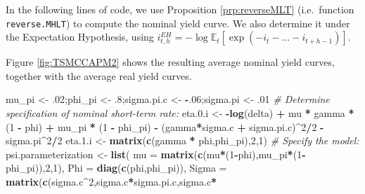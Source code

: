 \documentclass[
  12pt,
]{book}
\newenvironment{Shaded}{\begin{snugshade}}{\end{snugshade}}
\newcommand{\AttributeTok}[1]{\textcolor[rgb]{0.13,0.29,0.53}{#1}}
\newcommand{\CommentTok}[1]{\textcolor[rgb]{0.56,0.35,0.01}{\textit{#1}}}
\newcommand{\DecValTok}[1]{\textcolor[rgb]{0.00,0.00,0.81}{#1}}
\newcommand{\FloatTok}[1]{\textcolor[rgb]{0.00,0.00,0.81}{#1}}
\newcommand{\FunctionTok}[1]{\textcolor[rgb]{0.13,0.29,0.53}{\textbf{#1}}}
\newcommand{\NormalTok}[1]{#1}
\newcommand{\OtherTok}[1]{\textcolor[rgb]{0.56,0.35,0.01}{#1}}
\newcommand{\SpecialCharTok}[1]{\textcolor[rgb]{0.81,0.36,0.00}{\textbf{#1}}}
\theoremstyle{definition}
\theoremstyle{definition}
\theoremstyle{definition}
\theoremstyle{definition}
\theoremstyle{remark}
\begin{document}
In the following lines of code, we use Proposition \ref{prp:reverseMLT} (i.e.~function \texttt{reverse.MHLT}) to compute the nominal yield curve. We also determine it under the Expectation Hypothesis, using \(i^{EH}_{t,h} = - \log \mathbb{E}_t [\exp(-i_t - \dots - i_{t+h-1})]\).

Figure \ref{fig:TSMCCAPM2} shows the resulting average nominal yield curves, together with the average real yield curves.

\begin{Shaded}
\begin{Highlighting}[]
\NormalTok{mu\_pi }\OtherTok{\textless{}{-}}\NormalTok{ .}\DecValTok{02}\NormalTok{;phi\_pi }\OtherTok{\textless{}{-}}\NormalTok{ .}\DecValTok{8}\NormalTok{;sigma.pi.c }\OtherTok{\textless{}{-}} \SpecialCharTok{{-}}\NormalTok{.}\DecValTok{06}\NormalTok{;sigma.pi   }\OtherTok{\textless{}{-}}\NormalTok{ .}\DecValTok{01}
\CommentTok{\# Determine specification of nominal short{-}term rate:}
\NormalTok{eta.}\FloatTok{0.}\NormalTok{i }\OtherTok{\textless{}{-}} \SpecialCharTok{{-}}\FunctionTok{log}\NormalTok{(delta) }\SpecialCharTok{+}\NormalTok{ mu }\SpecialCharTok{*}\NormalTok{ gamma }\SpecialCharTok{*}\NormalTok{ (}\DecValTok{1} \SpecialCharTok{{-}}\NormalTok{ phi) }\SpecialCharTok{+}\NormalTok{ mu\_pi }\SpecialCharTok{*} 
\NormalTok{  (}\DecValTok{1} \SpecialCharTok{{-}}\NormalTok{ phi\_pi) }\SpecialCharTok{{-}}\NormalTok{ (gamma}\SpecialCharTok{*}\NormalTok{sigma.c }\SpecialCharTok{+}\NormalTok{ sigma.pi.c)}\SpecialCharTok{\^{}}\DecValTok{2}\SpecialCharTok{/}\DecValTok{2} \SpecialCharTok{{-}}\NormalTok{ sigma.pi}\SpecialCharTok{\^{}}\DecValTok{2}\SpecialCharTok{/}\DecValTok{2}
\NormalTok{eta.}\FloatTok{1.}\NormalTok{i }\OtherTok{\textless{}{-}} \FunctionTok{matrix}\NormalTok{(}\FunctionTok{c}\NormalTok{(gamma }\SpecialCharTok{*}\NormalTok{ phi,phi\_pi),}\DecValTok{2}\NormalTok{,}\DecValTok{1}\NormalTok{)}
\CommentTok{\# Specify the model:}
\NormalTok{psi.parameterization }\OtherTok{\textless{}{-}} \FunctionTok{list}\NormalTok{(}
  \AttributeTok{mu =} \FunctionTok{matrix}\NormalTok{(}\FunctionTok{c}\NormalTok{(mu}\SpecialCharTok{*}\NormalTok{(}\DecValTok{1}\SpecialCharTok{{-}}\NormalTok{phi),mu\_pi}\SpecialCharTok{*}\NormalTok{(}\DecValTok{1}\SpecialCharTok{{-}}\NormalTok{phi\_pi)),}\DecValTok{2}\NormalTok{,}\DecValTok{1}\NormalTok{),}
  \AttributeTok{Phi =} \FunctionTok{diag}\NormalTok{(}\FunctionTok{c}\NormalTok{(phi,phi\_pi)),}
  \AttributeTok{Sigma =} \FunctionTok{matrix}\NormalTok{(}\FunctionTok{c}\NormalTok{(sigma.c}\SpecialCharTok{\^{}}\DecValTok{2}\NormalTok{,sigma.c}\SpecialCharTok{*}\NormalTok{sigma.pi.c,sigma.c}\SpecialCharTok{*}

\end{Highlighting}
\end{Shaded}
\end{document}
